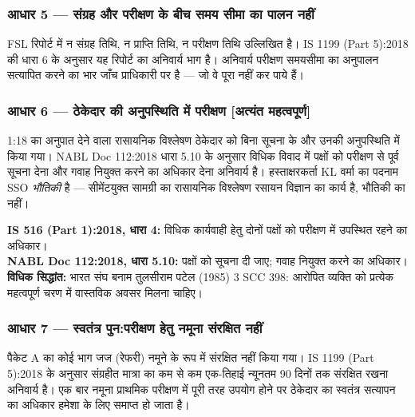 \documentclass[12pt, a4paper]{article}
\begin{document}
\subsubsection{आधार 5 --- संग्रह और परीक्षण के बीच समय सीमा का पालन नहीं}

FSL रिपोर्ट में न संग्रह तिथि, न प्राप्ति तिथि, न परीक्षण तिथि उल्लिखित है। IS 1199 (Part 5):2018 की धारा 6 के अनुसार यह रिपोर्ट का अनिवार्य भाग है। अनिवार्य परीक्षण समयसीमा का अनुपालन सत्यापित करने का भार जाँच प्राधिकारी पर है --- जो वे पूरा नहीं कर पाये हैं।

\subsubsection{आधार 6 --- ठेकेदार की अनुपस्थिति में परीक्षण \textbf{[अत्यंत महत्वपूर्ण]}}

\begin{groundbox}
1:18 का अनुपात देने वाला रासायनिक विश्लेषण ठेकेदार को बिना सूचना के और उनकी अनुपस्थिति में किया गया। NABL Doc 112:2018 धारा 5.10 के अनुसार विधिक विवाद में पक्षों को परीक्षण से पूर्व सूचना देना और गवाह नियुक्त करने का अधिकार देना अनिवार्य है। हस्ताक्षरकर्ता KL वर्मा का पदनाम SSO \textit{भौतिकी} है --- सीमेंटयुक्त सामग्री का रासायनिक विश्लेषण रसायन विज्ञान का कार्य है, भौतिकी का नहीं।
\end{groundbox}

\begin{standardbox}
\textbf{IS 516 (Part 1):2018, धारा 4:} विधिक कार्यवाही हेतु दोनों पक्षों को परीक्षण में उपस्थित रहने का अधिकार।\\
\textbf{NABL Doc 112:2018, धारा 5.10:} पक्षों को सूचना दी जाए; गवाह नियुक्त करने का अधिकार।\\
\textbf{विधिक सिद्धांत:} भारत संघ बनाम तुलसीराम पटेल (1985) 3 SCC 398: आरोपित व्यक्ति को प्रत्येक महत्वपूर्ण चरण में वास्तविक अवसर मिलना चाहिए।
\end{standardbox}

\subsubsection{आधार 7 --- स्वतंत्र पुन:परीक्षण हेतु नमूना संरक्षित नहीं}

पैकेट A का कोई भाग जज (रेफरी) नमूने के रूप में संरक्षित नहीं किया गया। IS 1199 (Part 5):2018 के अनुसार संग्रहीत मात्रा का कम से कम एक-तिहाई न्यूनतम 90 दिनों तक संरक्षित रखना अनिवार्य है। एक बार नमूना प्राथमिक परीक्षण में पूरी तरह उपयोग होने पर ठेकेदार का स्वतंत्र सत्यापन का अधिकार हमेशा के लिए समाप्त हो जाता है।
\end{document}
